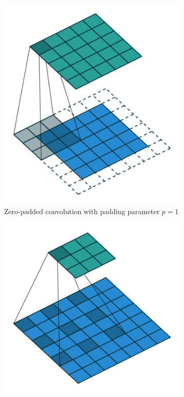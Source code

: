 \begin{figure}[htb!]
\centering
\begin{subfigure}[t]{0.45\textwidth}
    \centering
    \includegraphics[width=\textwidth]{images/padded_conv}
    \caption[Zero-padded convolution]{Zero-padded convolution with padding parameter $p=1$}
    \label{fig:padded_conv}
\end{subfigure}
\hfill
\begin{subfigure}[t]{0.45\textwidth}
    \centering
    \includegraphics[width=\textwidth]{images/dilated_conv}

\end{subfigure}
\end{figure}
